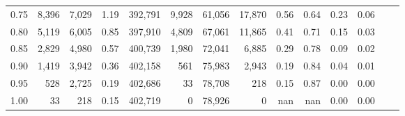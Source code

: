 \begin{tabular}{rrrrrrrrrrrrrr}
0.75 &   8,396 &  7,029 &    1.19 &  392,791 &    9,928 &  61,056 &  17,870 &  0.56 &  0.64 &  0.23 &      0.06 \\
0.80 &   5,119 &  6,005 &    0.85 &  397,910 &    4,809 &  67,061 &  11,865 &  0.41 &  0.71 &  0.15 &      0.03 \\
0.85 &   2,829 &  4,980 &    0.57 &  400,739 &    1,980 &  72,041 &   6,885 &  0.29 &  0.78 &  0.09 &      0.02 \\
0.90 &   1,419 &  3,942 &    0.36 &  402,158 &      561 &  75,983 &   2,943 &  0.19 &  0.84 &  0.04 &      0.01 \\
0.95 &     528 &  2,725 &    0.19 &  402,686 &       33 &  78,708 &     218 &  0.15 &  0.87 &  0.00 &      0.00 \\
1.00 &      33 &    218 &    0.15 &  402,719 &        0 &  78,926 &       0 &   nan &   nan &  0.00 &      0.00 \\
\bottomrule
\end{tabular}
